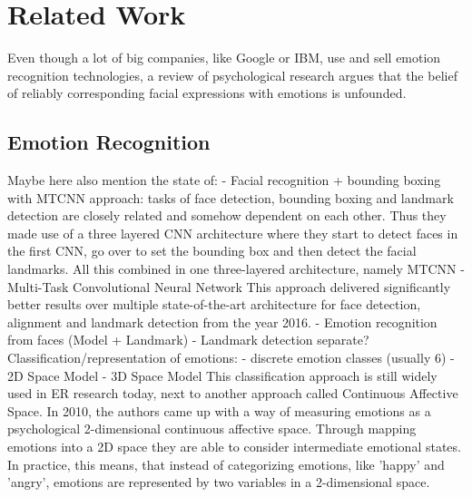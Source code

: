 \chapter{Related Work}




Even though a lot of big companies, like Google or IBM, use and sell emotion recognition technologies, a review of psychological research argues that the belief of reliably corresponding facial expressions with emotions is unfounded. \cite{Vincent:2019:EmotionRecCantBeTrusted}

\section{Emotion Recognition}
Maybe here also mention the state of:
- Facial recognition + bounding boxing with MTCNN \cite{Zhang:2016:MTCCN}
approach: tasks of face detection, bounding boxing and landmark detection are closely related and somehow dependent on each other. Thus they made use of a three layered CNN architecture where they start to detect faces in the first CNN, go over to set the bounding box and then detect the facial landmarks. All this combined in one three-layered architecture, namely MTCNN - Multi-Task Convolutional Neural Network
This approach delivered significantly better results over multiple state-of-the-art architecture for face detection, alignment and landmark detection from the year 2016.
- Emotion recognition from faces (Model + Landmark)
- Landmark detection separate?
\newline\newline
Classification/representation of emotions:
- discrete emotion classes (usually 6)
- 2D Space Model \cite{Hupont:2010:FacialEmotionsIn2DAffectiveSpace}
- 3D Space Model \cite{Verma:2017:3D-VAD}
\newline\newline
This classification approach is still widely used in \gls{ER} research today, next to another approach called Continuous Affective Space. In 2010, the authors \citeauthor{Hupont:2010:FacialEmotionsIn2DAffectiveSpace} \cite{Hupont:2010:FacialEmotionsIn2DAffectiveSpace} came up with a way of measuring emotions as a psychological 2-dimensional continuous affective space. Through mapping emotions into a 2D space they are able to consider intermediate emotional states. In practice, this means, that instead of categorizing emotions, like 'happy' and 'angry', emotions are represented by two variables in a 2-dimensional space.
